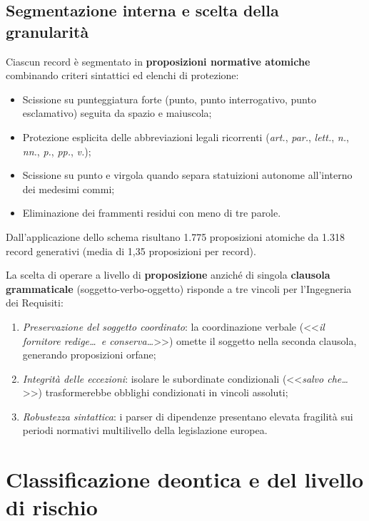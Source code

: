 \documentclass[12pt,a4paper,oneside]{report}
\begin{document}
\subsection{Segmentazione interna e scelta della granularità}
Ciascun record è segmentato in \textbf{proposizioni normative atomiche} combinando criteri sintattici ed elenchi di protezione:
\begin{itemize}
    \item Scissione su punteggiatura forte (punto, punto interrogativo, punto esclamativo) seguita da spazio e maiuscola;
    \item Protezione esplicita delle abbreviazioni legali ricorrenti (\emph{art.}, \emph{par.}, \emph{lett.}, \emph{n.}, \emph{nn.}, \emph{p.}, \emph{pp.}, \emph{v.});
    \item Scissione su punto e virgola quando separa statuizioni autonome all'interno dei medesimi commi;
    \item Eliminazione dei frammenti residui con meno di tre parole.
\end{itemize}

Dall'applicazione dello schema risultano 1.775 proposizioni atomiche da 1.318 record generativi (media di 1,35 proposizioni per record). 

La scelta di operare a livello di \textbf{proposizione} anziché di singola \textbf{clausola grammaticale} (soggetto-verbo-oggetto) risponde a tre vincoli per l'Ingegneria dei Requisiti:
\begin{enumerate}
    \item \emph{Preservazione del soggetto coordinato}: la coordinazione verbale (<<\emph{il fornitore redige\dots\ e conserva\dots}>>) omette il soggetto nella seconda clausola, generando proposizioni orfane;
    \item \emph{Integrità delle eccezioni}: isolare le subordinate condizionali (<<\emph{salvo che\dots}>>) trasformerebbe obblighi condizionati in vincoli assoluti;
    \item \emph{Robustezza sintattica}: i parser di dipendenze presentano elevata fragilità sui periodi normativi multilivello della legislazione europea.
\end{enumerate}

\section{Classificazione deontica e del livello di rischio}
\label{sec:classificazione_deontica_rischio}
\end{document}
